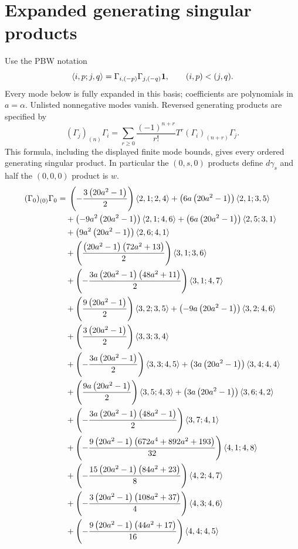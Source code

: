 \section{Expanded generating singular products}\label{w4d:app:modes}
Use the PBW notation
\[
 \langle i,p;j,q\rangle=\Gamma_{i,(-p)}\Gamma_{j,(-q)}\mathbf1,
 \qquad (i,p)<(j,q).
\]
Every mode below is fully expanded in this basis; coefficients are polynomials in $a=\alpha$. Unlisted nonnegative modes vanish. Reversed generating products are specified by
\[
 (\Gamma_j)_{(n)}\Gamma_i
  =\sum_{r\geq0}\frac{(-1)^{n+r}}{r!}T^r
     (\Gamma_i)_{(n+r)}\Gamma_j.
\]
This formula, including the displayed finite mode bounds, gives every ordered generating singular product. In particular the $(0,s,0)$ products define $d\gamma_s$ and half the $(0,0,0)$ product is $w$.
\begin{align*}
(\Gamma_0)_{(0)}\Gamma_0 &={} \left(- \frac{3 \left(20 a^{2} - 1\right)}{2}\right)\langle 2,1;2,4\rangle + \left(6 a \left(20 a^{2} - 1\right)\right)\langle 2,1;3,5\rangle\\
&\quad {}+ \left(- 9 a^{2} \left(20 a^{2} - 1\right)\right)\langle 2,1;4,6\rangle + \left(6 a \left(20 a^{2} - 1\right)\right)\langle 2,5;3,1\rangle\\
&\quad {}+ \left(9 a^{2} \left(20 a^{2} - 1\right)\right)\langle 2,6;4,1\rangle\\
&\quad {}+ \left(\frac{\left(20 a^{2} - 1\right) \left(72 a^{2} + 13\right)}{2}\right)\langle 3,1;3,6\rangle\\
&\quad {}+ \left(- \frac{3 a \left(20 a^{2} - 1\right) \left(48 a^{2} + 11\right)}{2}\right)\langle 3,1;4,7\rangle\\
&\quad {}+ \left(\frac{9 \left(20 a^{2} - 1\right)}{2}\right)\langle 3,2;3,5\rangle + \left(- 9 a \left(20 a^{2} - 1\right)\right)\langle 3,2;4,6\rangle\\
&\quad {}+ \left(\frac{3 \left(20 a^{2} - 1\right)}{2}\right)\langle 3,3;3,4\rangle\\
&\quad {}+ \left(- \frac{3 a \left(20 a^{2} - 1\right)}{2}\right)\langle 3,3;4,5\rangle + \left(3 a \left(20 a^{2} - 1\right)\right)\langle 3,4;4,4\rangle\\
&\quad {}+ \left(\frac{9 a \left(20 a^{2} - 1\right)}{2}\right)\langle 3,5;4,3\rangle + \left(3 a \left(20 a^{2} - 1\right)\right)\langle 3,6;4,2\rangle\\
&\quad {}+ \left(- \frac{3 a \left(20 a^{2} - 1\right) \left(48 a^{2} - 1\right)}{2}\right)\langle 3,7;4,1\rangle\\
&\quad {}+ \left(- \frac{9 \left(20 a^{2} - 1\right) \left(672 a^{4} + 892 a^{2} + 193\right)}{32}\right)\langle 4,1;4,8\rangle\\
&\quad {}+ \left(- \frac{15 \left(20 a^{2} - 1\right) \left(84 a^{2} + 23\right)}{8}\right)\langle 4,2;4,7\rangle\\
&\quad {}+ \left(- \frac{3 \left(20 a^{2} - 1\right) \left(108 a^{2} + 37\right)}{4}\right)\langle 4,3;4,6\rangle\\
&\quad {}+ \left(- \frac{9 \left(20 a^{2} - 1\right) \left(44 a^{2} + 17\right)}{16}\right)\langle 4,4;4,5\rangle
\end{align*}
